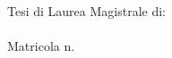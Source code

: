 \begin{titlepage}
\begin{center}
        \vfill  
        
        \flushright
        \normalsize{Tesi di Laurea Magistrale di:}\\
        \medskip \spacedlowsmallcaps{\myFirstAuthorName}\\
		Matricola n. \myMatrFirstAuthor \\ 
		
		\vfill 

		\centering {\myAcademicYearIT}                     

    \end{center}  
\end{titlepage}